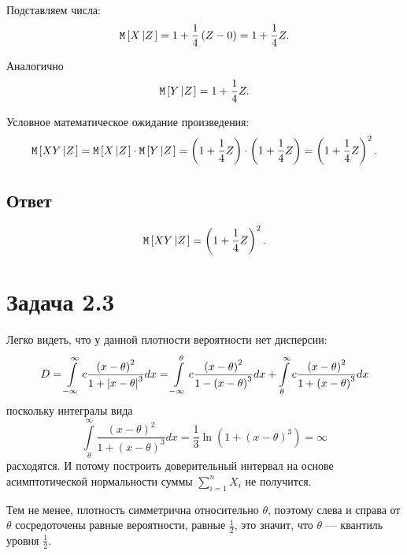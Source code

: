 Подставляем числа:
\begin{equation}
    \mathtt{M} \left [  X \left | Z \right . \right ]
    = 1 + \frac{1}{4} \left ( Z - 0 \right )
    = 1 + \frac{1}{4} Z .
\end{equation}

Аналогично
\begin{equation}
    \mathtt{M} \left [  Y \left | Z \right . \right ] = 1 + \frac{1}{4} Z .
\end{equation}

Условное математическое ожидание произведения:
\begin{equation}
    \mathtt{M} \left [  XY \left | Z \right . \right ]
    = \mathtt{M} \left [  X \left | Z \right . \right ] \cdot \mathtt{M} \left [  Y \left | Z \right . \right ]
    = \left ( 1 + \frac{1}{4} Z \right ) \cdot \left ( 1 + \frac{1}{4} Z \right )
    = \left ( 1 + \frac{1}{4} Z \right )^2 .
\end{equation}

\subsection{Ответ}
\begin{equation}
    \mathtt{M} \left [  XY \left | Z \right . \right ] = \left ( 1 + \frac{1}{4} Z \right )^2 .
\end{equation}

\section*{Задача 2.3}

Легко видеть, что у данной плотности вероятности нет дисперсии:
\begin{equation}
    D
    = \int \limits_{-\infty}^{\infty} c \frac{\left ( x - \theta \right )^2}{1 + \left | x - \theta \right |^3} dx
    = \int \limits_{-\infty}^{\theta} c \frac{\left ( x - \theta \right )^2}{1 - \left ( x - \theta \right )^3} dx
    + \int \limits_{\theta}^{\infty} c \frac{\left ( x - \theta \right )^2}{1 + \left ( x - \theta \right )^3} dx
\end{equation}
поскольку интегралы вида
\begin{equation}
    \int \limits_{\theta}^{\infty} \frac{\left ( x - \theta \right )^2}{1 + \left ( x - \theta \right )^3} dx
    = \frac{1}{3} \ln \left ( 1 + \left ( x - \theta \right )^3 \right ) = \infty
\end{equation}
расходятся. И потому построить доверительный интервал на основе асимптотической нормальности суммы $\sum_{i=1}^n X_i$ не
получится.

Тем не менее, плотность симметрична относительно $\theta$, поэтому слева и справа от $\theta$ сосредоточены равные вероятности, равные
$\frac{1}{2}$, это значит, что $\theta$ --- квантиль уровня $\frac{1}{2}$.

